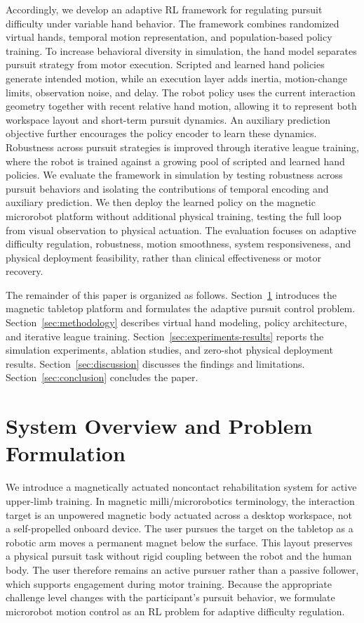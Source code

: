 \documentclass[lettersize,journal]{IEEEtran}
\begin{document}
Accordingly, we develop an adaptive RL framework for regulating pursuit difficulty under variable hand behavior. The framework combines randomized virtual hands, temporal motion representation, and population-based policy training. To increase behavioral diversity in simulation, the hand model separates pursuit strategy from motor execution. Scripted and learned hand policies generate intended motion, while an execution layer adds inertia, motion-change limits, observation noise, and delay. The robot policy uses the current interaction geometry together with recent relative hand motion, allowing it to represent both workspace layout and short-term pursuit dynamics. An auxiliary prediction objective further encourages the policy encoder to learn these dynamics. Robustness across pursuit strategies is improved through iterative league training, where the robot is trained against a growing pool of scripted and learned hand policies. We evaluate the framework in simulation by testing robustness across pursuit behaviors and isolating the contributions of temporal encoding and auxiliary prediction. We then deploy the learned policy on the magnetic microrobot platform without additional physical training, testing the full loop from visual observation to physical actuation. The evaluation focuses on adaptive difficulty regulation, robustness, motion smoothness, system responsiveness, and physical deployment feasibility, rather than clinical effectiveness or motor recovery.

The remainder of this paper is organized as follows. Section~\ref{sec:system-overview} introduces the magnetic tabletop platform and formulates the adaptive pursuit control problem. Section~\ref{sec:methodology} describes virtual hand modeling, policy architecture, and iterative league training. Section~\ref{sec:experiments-results} reports the simulation experiments, ablation studies, and zero-shot physical deployment results. Section~\ref{sec:discussion} discusses the findings and limitations. Section~\ref{sec:conclusion} concludes the paper.

\section{System Overview and Problem Formulation}
\label{sec:system-overview}
We introduce a magnetically actuated noncontact rehabilitation system for active upper-limb training. In magnetic milli/microrobotics terminology, the interaction target is an unpowered magnetic body actuated across a desktop workspace, not a self-propelled onboard device. The user pursues the target on the tabletop as a robotic arm moves a permanent magnet below the surface. This layout preserves a physical pursuit task without rigid coupling between the robot and the human body. The user therefore remains an active pursuer rather than a passive follower, which supports engagement during motor training. Because the appropriate challenge level changes with the participant's pursuit behavior, we formulate microrobot motion control as an RL problem for adaptive difficulty regulation.
\end{document}
